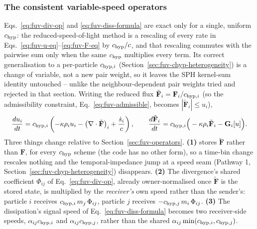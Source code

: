 \subsubsection{The consistent variable-speed operators}
\label{sec:fuv-variable-c-operators}

Eqs.~\ref{eq:fuv-div-op} and \ref{eq:fuv-diss-formula} are exact only for
a single, uniform $c_{\rm hyp}$: the reduced-speed-of-light method is a
rescaling of every rate in
Eqs.~\ref{eq:fuv-u-eq}--\ref{eq:fuv-F-eq} by $c_{\rm hyp}/c$, and that
rescaling commutes with the pairwise sum only when the same $c_{\rm hyp}$
multiplies every term. Its correct generalisation to a per-particle
$c_{{\rm hyp},i}$ (Section~\ref{sec:fuv-chyp-heterogeneity}) is a change
of variable, not a new pair weight, so it leaves the SPH kernel-sum
identity untouched -- unlike the neighbour-dependent pair weights tried
and rejected in that section. Writing the reduced flux
$\tilde{\mathbf F}_i = \mathbf F_i/c_{{\rm hyp},i}$ (so the admissibility
constraint, Eq.~\ref{eq:fuv-admissible}, becomes $|\tilde{\mathbf
F}_i|\le u_i$),
\begin{equation}
  \frac{du_i}{dt} = c_{{\rm hyp},i}\left(-\kappa\rho_i u_i
    - \big(\nabla\cdot\tilde{\mathbf F}\big)_i + \frac{\dot s_i}{c}\right) ,
  \qquad
  \frac{d\tilde{\mathbf F}_i}{dt} = c_{{\rm hyp},i}\Big(-\kappa\rho_i
    \tilde{\mathbf F}_i - \mathbf G_i[u]\Big) .
  \label{eq:fuv-variable-c-eqs}
\end{equation}
Three things change relative to Section~\ref{sec:fuv-operators}.
\textbf{(1)}  stores $\tilde{\mathbf F}$ rather than
$\mathbf F$, for every $c_{\rm hyp}$ scheme (the code has no other form), so
a time-bin change rescales nothing and the
temporal-impedance jump at a speed seam (Pathway 1,
Section~\ref{sec:fuv-chyp-heterogeneity}) disappears. \textbf{(2)} The
divergence's shared coefficient $\Phi_{ij}$ of Eq.~\ref{eq:fuv-div-op},
already owner-normalised once $\tilde{\mathbf F}$ is the stored state, is
multiplied by the \emph{receiver's} own speed rather than the sender's:
particle $i$ receives $c_{{\rm hyp},i}\,m_j\,\Phi_{ij}$, particle $j$
receives $-c_{{\rm hyp},j}\,m_i\,\Phi_{ij}$. \textbf{(3)} The
dissipation's signal speed of Eq.~\ref{eq:fuv-diss-formula} becomes two
receiver-side speeds, $\alpha_{ij}c_{{\rm hyp},i}$ and $\alpha_{ij}c_{{\rm
hyp},j}$, rather than the shared $\alpha_{ij}\min(c_{{\rm hyp},i},c_{{\rm
hyp},j})$.

